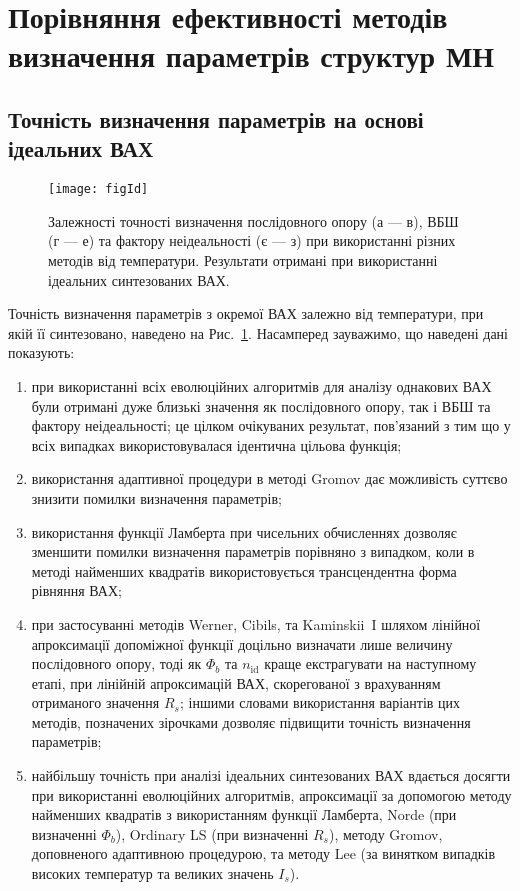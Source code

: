 \section{Порівняння ефективності методів визначення параметрів структур МН}

\subsection{Точність визначення параметрів на основі ідеальних ВАХ}

\begin{figure}
\center
\texttt{[image: figId]}%
\caption{\label{figId}
Залежності точності визначення послідовного опору (а --- в), ВБШ (г --- е) та фактору неідеальності (є --- з) при використанні різних методів від температури.
Результати отримані при використанні ідеальних синтезованих ВАХ.
}
\end{figure}

Точність визначення параметрів з окремої ВАХ залежно від температури, при якій її синтезовано, наведено на Рис.~\ref{figId}.
Насамперед зауважимо, що наведені дані показують:
\begin{enumerate}[label=\asbuk*),leftmargin=0em,itemindent=1.5em]
\item при використанні всіх еволюційних алгоритмів для аналізу однакових ВАХ були отримані дуже близькі значення як послідовного опору, так і ВБШ та фактору неідеальності;
це цілком очікуваних результат, пов'язаний з тим що у всіх випадках використовувалася ідентична цільова функція;
\item використання адаптивної процедури в методі Gromov дає можливість суттєво знизити помилки визначення параметрів;
\item використання функції Ламберта при чисельних обчисленнях дозволяє зменшити помилки визначення параметрів порівняно з випадком, коли в методі найменших квадратів використовується трансцендентна форма рівняння ВАХ;
\item при застосуванні методів Werner, Cibils, та Kaminskii~I шляхом лінійної апроксимації допоміжної функції доцільно визначати лише величину послідовного опору,
тоді як $\Phi_b$ та $n_\mathrm{id}$ краще екстрагувати на наступному етапі, при лінійній апроксимацій ВАХ, скорегованої з врахуванням  отриманого значення $R_s$;
іншими словами використання варіантів цих методів, позначених зірочками дозволяє підвищити точність визначення параметрів;
\item найбільшу точність при аналізі ідеальних синтезованих ВАХ вдається досягти при використанні еволюційних алгоритмів, апроксимації за допомогою методу найменших квадратів з використанням функції Ламберта, Norde (при визначенні $\Phi_b$), Ordinary LS (при визначенні $R_s$), методу Gromov, доповненого адаптивною процедурою, та методу Lee (за винятком випадків високих температур та великих значень $I_s$).
\end{enumerate}


